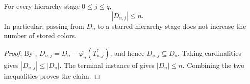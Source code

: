 \begin{lemma}
For every hierarchy stage $0\leq j\leq q$,
\[
 |D_{n,j}|\leq n.
\]
In particular, passing from $D_n$ to a starred hierarchy stage does not
increase the number of stored colors.
\end{lemma}
\begin{proof}
By ,
$D_{n,j}=D_n-\overline{\varphi_n}(T_{n,j}^{*})$, and hence
$D_{n,j}\subseteq D_n$.  Taking cardinalities gives
$|D_{n,j}|\leq |D_n|$.  The terminal instance of
 gives $|D_n|\leq n$.
Combining the two inequalities proves the claim.
\end{proof}
